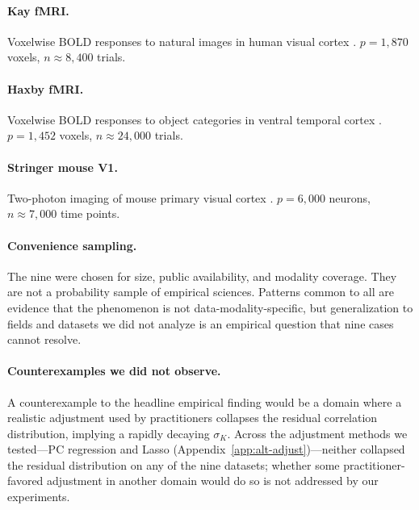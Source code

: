 \paragraph{Kay fMRI.} Voxelwise BOLD responses to natural images in human visual cortex \citep{kay2008}. $p=1{,}870$ voxels, $n\approx 8{,}400$ trials.

\paragraph{Haxby fMRI.} Voxelwise BOLD responses to object categories in ventral temporal cortex \citep{haxby2001}. $p=1{,}452$ voxels, $n\approx 24{,}000$ trials.

\paragraph{Stringer mouse V1.} Two-photon imaging of mouse primary visual cortex \citep{stringer2019}. $p=6{,}000$ neurons, $n\approx 7{,}000$ time points.

\paragraph{Convenience sampling.} The nine were chosen for size, public availability, and modality coverage. They are not a probability sample of empirical sciences. Patterns common to all are evidence that the phenomenon is not data-modality-specific, but generalization to fields and datasets we did not analyze is an empirical question that nine cases cannot resolve.

\paragraph{Counterexamples we did not observe.} A counterexample to the headline empirical finding would be a domain where a realistic adjustment used by practitioners collapses the residual correlation distribution, implying a rapidly decaying $\sigma_K$. Across the adjustment methods we tested---PC regression and Lasso (Appendix~\ref{app:alt-adjust})---neither collapsed the residual distribution on any of the nine datasets; whether some practitioner-favored adjustment in another domain would do so is not addressed by our experiments.
